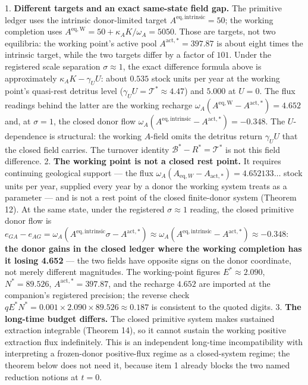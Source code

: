 \documentclass[11pt]{article}
\begin{document}
1. \textbf{Different targets and an exact same-state field gap.} The primitive ledger uses the intrinsic donor-limited target \(A^{\mathrm{eq,intrinsic}}=50\); the working completion uses \(A^{\mathrm{eq,W}}=50+\kappa_AK/\omega_A=5050\). Those are targets, not two equilibria: the working point's active pool \(A^{\mathrm{act,*}}=397.87\) is about eight times the intrinsic target, while the two targets differ by a factor of \(101\). Under the registered scale separation \(\sigma\approx1\), the exact difference formula above is approximately \(\kappa_AK-\gamma_UU\): about \(0.535\) stock units per year at the working point's quasi-rest detritus level (\(\gamma_UU=\mathcal T^*\approx4.47\)) and \(5.000\) at \(U=0\). The flux readings behind the latter are the working recharge \(\omega_A(A^{\mathrm{eq,W}}-A^{\mathrm{act,*}})=4.652\) and, at \(\sigma=1\), the closed donor flow \(\omega_A(A^{\mathrm{eq,intrinsic}}-A^{\mathrm{act,*}})=-0.348\). The \(U\)-dependence is structural: the working \(A\)-field omits the detritus return \(\gamma_UU\) that the closed field carries. The turnover identity \(\mathcal B^*-R^*=\mathcal T^*\) is not this field difference.
2. \textbf{The working point is not a closed rest point.} It requires continuing geological support --- the flux \(\omega_A(A_{\mathrm{eq},W}-A_{\mathrm{act},*})=4.652133\ldots\) stock units per year, supplied every year by a donor the working system treats as a parameter --- and is not a rest point of the closed finite-donor system (Theorem 12). At the same state, under the registered \(\sigma\approx1\) reading, the closed primitive donor flow is \(e_{GA}-e_{AG}=\omega_A(A^{\mathrm{eq,intrinsic}}\sigma-A^{\mathrm{act,*}})\approx\omega_A(A^{\mathrm{eq,intrinsic}}-A^{\mathrm{act,*}})\approx-0.348\): \textbf{the donor gains in the closed ledger where the working completion has it losing 4.652} --- the two fields have opposite signs on the donor coordinate, not merely different magnitudes. The working-point figures \(E^* \approx 2.090\), \(N^* = 89.526\), \(A^{\mathrm{act,*}} = 397.87\), and the recharge \(4.652\) are imported at the companion's registered precision; the reverse check \(qE^*N^* = 0.001 \times 2.090 \times 89.526 \approx 0.187\) is consistent to the quoted digits.
3. \textbf{The long-time budget differs.} The closed primitive system makes sustained extraction integrable (Theorem 14), so it cannot sustain the working positive extraction flux indefinitely. This is an independent long-time incompatibility with interpreting a frozen-donor positive-flux regime as a closed-system regime; the theorem below does not need it, because item 1 already blocks the two named reduction notions at \(t=0\).
\end{document}
